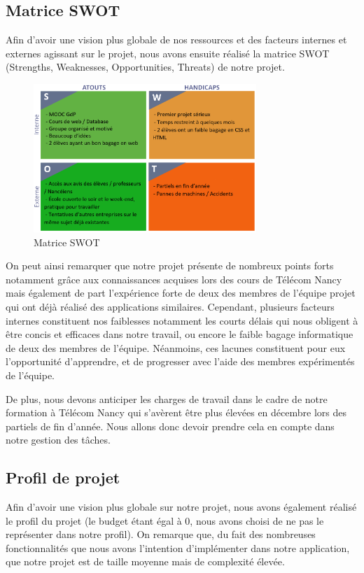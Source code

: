 \documentclass[french,a4paper]{article}
\begin{document}
\subsection{Matrice SWOT}
Afin d’avoir une vision plus globale de nos ressources et des facteurs internes et externes agissant sur le projet, nous avons ensuite réalisé la matrice SWOT (Strengths, Weaknesses, Opportunities, Threats) de notre projet.

\begin{figure}[H]
    \centering
    \includegraphics[width=0.75\textwidth]{img/SWOT.png}
    \caption{Matrice SWOT}
\end{figure}

On peut ainsi remarquer que notre projet présente de nombreux points forts notamment grâce aux connaissances acquises lors des cours de Télécom Nancy mais également de part l’expérience forte de deux des membres de l’équipe projet qui ont déjà réalisé des applications similaires.  Cependant, plusieurs facteurs internes constituent nos faiblesses notamment les courts délais qui nous obligent à être concis et efficaces dans notre travail, ou encore le faible bagage informatique de deux des membres de l’équipe. Néanmoins, ces lacunes constituent pour eux l’opportunité d’apprendre, et de progresser avec l’aide des membres expérimentés de l’équipe.

De plus, nous devons anticiper les charges de travail dans le cadre de notre formation à Télécom Nancy qui s'avèrent être plus élevées en décembre lors des partiels de fin d'année. Nous allons donc devoir prendre cela en compte dans notre gestion des tâches.

\subsection{Profil de projet}

Afin d’avoir une vision plus globale sur notre projet, nous avons également réalisé le profil du projet (le budget étant égal à 0, nous avons choisi de ne pas le représenter dans notre profil). On remarque que, du fait des nombreuses fonctionnalités que nous avons l’intention d’implémenter dans notre application, que notre projet est de taille moyenne mais de complexité élevée.
\end{document}

